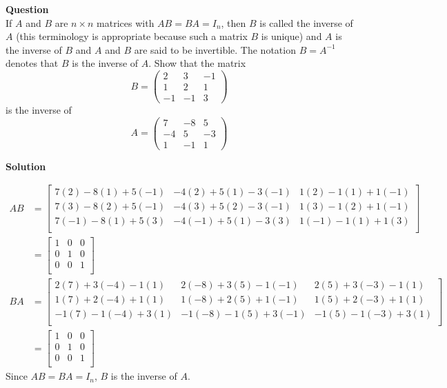 \documentclass[article,12pt]{article}
\newcounter{question}
\def\questionnum{{\Large\bfseries{Question \arabic{question} }}\\[1em]}
\newcommand{\question}{
    \stepcounter{question}
    \questionnum
}
\newcommand{\solution}{
    {{\large\bfseries{Solution}}}
}
\begin{document}
\newpage

\question
If $A$ and $B$ are $n \times n$ matrices with $AB = BA = I_n$, then $B$ is called the inverse of $A$ (this terminology is appropriate because such a matrix $B$ is unique) and $A$ is the inverse of $B$ and $A$ and $B$ are said to be invertible. The notation $B = A^{-1} $ denotes that $B$ is the inverse of $A$. Show that  the matrix 
\[B=\left( \begin{array}{ccc}2 & 3 & -1 \\1 & 2 & 1\\-1 &  -1 &3\end{array} \right) \] is the inverse of  \[ A=\left( \begin{array}{ccc}7 & -8 & 5 \\-4 & 5 & -3\\1 &  -1 &1\end{array} \right) \]

\solution
\begin{align*}
    AB &= 
    \begin{bmatrix}
        7(2)-8(1)+5(-1) & -4(2)+5(1)-3(-1) & 1(2)-1(1)+1(-1) \\
        7(3)-8(2)+5(-1) & -4(3)+5(2)-3(-1) & 1(3)-1(2)+1(-1) \\
        7(-1)-8(1)+5(3) & -4(-1)+5(1)-3(3) & 1(-1)-1(1)+1(3) \\
    \end{bmatrix} \\
    &=
    \begin{bmatrix}
        1 & 0 & 0 \\
        0 & 1 & 0 \\
        0 & 0 & 1 \\
    \end{bmatrix} \\
    BA &= 
    \begin{bmatrix}
        2(7)+3(-4)-1(1)  & 2(-8)+3(5)-1(-1)  & 2(5)+3(-3)-1(1) \\
        1(7)+2(-4)+1(1)  & 1(-8)+2(5)+1(-1)  & 1(5)+2(-3)+1(1) \\
        -1(7)-1(-4)+3(1) & -1(-8)-1(5)+3(-1) & -1(5)-1(-3)+3(1) \\  
    \end{bmatrix} \\
    &=
    \begin{bmatrix}
        1 & 0 & 0 \\
        0 & 1 & 0 \\
        0 & 0 & 1 \\
    \end{bmatrix}
\end{align*}
Since $AB=BA=I_n$, $B$ is the inverse of $A$.
\newpage
\end{document}
